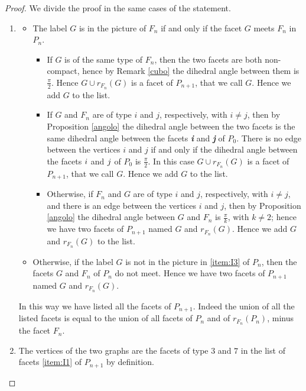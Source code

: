 \documentclass{amsart}
\theoremstyle{definition}
\theoremstyle{remark}
\begin{document}
\begin{proof}
We divide the proof in the same cases of the statement.
    \begin{enumerate}
        \item[\ref{item:I1}] 
        \begin{itemize}
            \item The label $G$ is  in the picture of $F_n$ if and only if the facet $G$ meets $F_n$ in $P_n$.
            \begin{itemize}
                \item If $G$ is of the same type of $F_n$, then the two facets are both non-compact, hence by Remark \ref{cubo} the dihedral angle between them is $\frac{\pi}{2}$. Hence $G\cup r_{F_n}(G)$ is a facet of $P_{n+1}$, that we call $G$. Hence we add $G$ to the list.
                \item If $G$ and $F_n$ are of type $i$ and $j$, respectively, with $i\ne j$, then by Proposition \ref{angolo} the dihedral angle between the two facets is the same dihedral angle between the facets \textit{\textbf{i}} and \textit{\textbf{j}} of $P_0$. There is no edge between the vertices $i$ and $j$ if and only if the dihedral angle between the facets $\textit{\textbf{i}}$ and $\textit{\textbf{j}}$ of $P_0$ is $\frac{\pi}{2}$. In this case $G\cup r_{F_n}(G)$ is a facet of $P_{n+1}$, that we call $G$. Hence we add $G$ to the list.
                \item Otherwise, if $F_n$ and $G$ are of type $i$ and $j$, respectively, with $i\ne j$, and there is an edge between the vertices $i$ and $j$, then by Proposition \ref{angolo} the dihedral angle between $G$ and $F_n$ is $\frac{\pi}{k}$, with $k\ne 2$; hence we have two facets of $P_{n+1}$ named $G$ and $r_{F_n}(G)$. Hence we add $G$ and $r_{F_n}(G)$ to the list.
            \end{itemize}
            \item Otherwise, if the label $G$ is not in the picture in \ref{item:I3} of $P_n$, then the facets $G$ and $F_n$ of $P_n$ do not meet. 
            Hence we have two facets of $P_{n+1}$ named $G$ and $r_{F_n}(G)$.
        \end{itemize}
        In this way we have listed all the facets of $P_{n+1}$. Indeed the union of all the listed facets is equal to the union of all facets of $P_n$ and of $r_{F_n}(P_n)$, minus the facet $F_n$.
        \item[\ref{item:I2}] The vertices of the two graphs are the facets of type $3$ and $7$ in the list of facets \ref{item:I1} of $P_{n+1}$ by definition.

\end{enumerate}
\end{proof}
\end{document}
